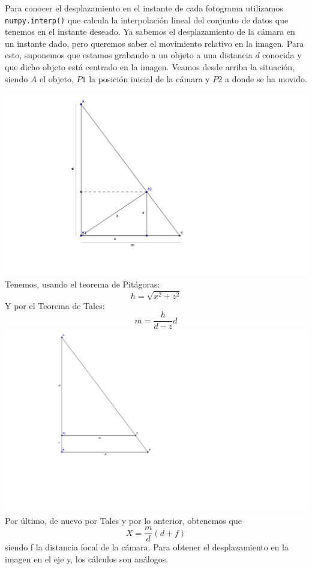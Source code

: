 \documentclass[a4paper,openright, 12pt]{book}
\begin{document}
Para conocer el desplazamiento en el instante de cada fotograma utilizamos \lstinline|numpy.interp()| que calcula la interpolación lineal del conjunto de datos que tenemos en el instante deseado. Ya sabemos el desplazamiento de la cámara en un instante dado, pero queremos saber el movimiento relativo en la imagen. Para esto, suponemos que estamos grabando a un objeto a una distancia $d$ conocida y que dicho objeto está centrado en la imagen.
Veamos desde arriba la situación, siendo $A$ el objeto, $P1$ la posición inicial de la cámara y $P2$ a donde se ha movido. 

\includegraphics{tales1}
\newpage
Tenemos, usando el teorema de Pitágoras:
\begin{equation*}
h=\sqrt{x^2 + z^2}
\end{equation*}
Y por el Teorema de Tales:
\begin{equation*}
m = \dfrac{h}{d-z}d
\end{equation*}
\includegraphics{tales2}
Por último, de nuevo por Tales y por lo anterior, obtenemos que
\begin{equation*}
X=\dfrac{m}{d}(d+f)
\end{equation*}
siendo f la distancia focal de la cámara.
Para obtener el desplazamiento en la imagen en el eje y, los cálculos son análogos.
\end{document}
